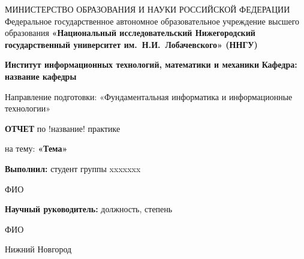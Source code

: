 {
\begin{titlepage}
  \begin{center}
    МИНИСТЕРСТВО ОБРАЗОВАНИЯ И НАУКИ РОССИЙСКОЙ ФЕДЕРАЦИИ\break
    Федеральное государственное автономное образовательное учреждение высшего образования\break
    \textbf{«Национальный исследовательский Нижегородский государственный университет им.~Н.И.~Лобачевского» (ННГУ)}
    \break

    \vspace*{1.25cm}

    \textbf{Институт информационных технологий, математики и механики}\break
    \textbf{Кафедра: название кафедры}
    \vspace{0.5cm}

    Направление подготовки: «Фундаментальная информатика и информационные технологии»\break

    \vspace{2.5cm}

    \large{\textbf{ОТЧЕТ}}\break
    по !название! практике\break

    \vspace{0.25cm}

    на тему:\break
    \large{\textbf{«Тема»}}
  \end{center}

\vspace{2cm}

\hfill\textbf{Выполнил:} студент группы xxxxxxx

 \hfill ФИО

 \hfill\textbf{Научный руководитель:} должность, степень

 \hfill ФИО
\vfill
\begin{center}
  Нижний Новгород
\end{center}
\end{titlepage}
}